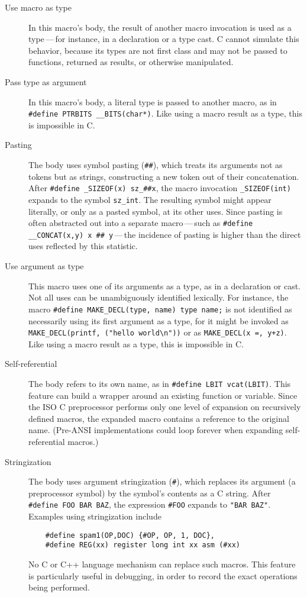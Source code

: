 \documentclass[10pt]{article}
\begin{document}
\begin{description}
\item[Use macro as type]
  In this macro's body, the result of another macro invocation is used as a
  type\,---\,for instance, in a declaration or a type cast.  C cannot
  simulate this behavior, because its types are not first class and may not
  be passed to functions, returned as results, or otherwise manipulated.

\item[Pass type as argument]
  In this macro's body, a literal type is passed to another macro, as in
  {\tt \#define PTRBITS \verb|__BITS|(char*)}.  Like using a macro result
  as a type, this is impossible in C\@.

\item[Pasting]\label{def:pasting}
  The body uses symbol pasting ({\tt \#\#}), which treats its arguments not
  as tokens but as strings, constructing a new token out of their
  concatenation.  After {\tt \#define \verb|_SIZEOF|(x) \verb|sz_|\#\#x},
  the macro invocation {\tt \verb|_SIZEOF|(int)} expands to the 
  symbol {\tt \verb|sz_int|}.  The resulting symbol might appear literally, or
  only as a pasted symbol, at its other uses.  Since pasting is often
  abstracted out into a separate macro\,---\,such as {\tt \#define
  \verb|__CONCAT|(x,y) x \#\# y}\,---\,the incidence of pasting is higher
  than the direct uses reflected by this statistic.

\item[Use argument as type]
  This macro uses one of its arguments as a type, as in a declaration or
  cast.  Not all uses can be unambiguously identified lexically.  For
  instance, the macro {\tt \#define \verb|MAKE_DECL|(type, name) type
  name;} is not identified as necessarily using its first argument as a
type, for it might be invoked as {\tt \verb|MAKE_DECL|(printf, ("hello
world\verb|\|n"))} or as {\tt \verb|MAKE_DECL|(x =, y+z)}.  Like using a
macro result as a type, this is impossible in C\@.

\item[Self-referential]
  The body refers to its own name, as in {\tt \#define LBIT vcat(LBIT)}.
  This feature can build a wrapper around an existing function or variable.
  Since the ISO C preprocessor performs only one level of expansion on
  recursively defined macros, the expanded macro contains a reference to
  the original name.  (Pre-ANSI implementations could loop forever when
  expanding self-referential macros.)

\item[Stringization]
  The body uses argument stringization ({\tt \#}), which replaces its
  argument (a preprocessor symbol) by the symbol's contents as a C string.
  After {\tt \#define FOO BAR BAZ}, the expression {\tt \#FOO} expands to
  {\tt "BAR~BAZ"}.  Examples using stringization include
\begin{verbatim}
    #define spam1(OP,DOC) {#OP, OP, 1, DOC},
    #define REG(xx) register long int xx asm (#xx)
\end{verbatim}
  No C or C++ language mechanism can replace such macros.  This feature is
  particularly useful in debugging, in order to record the exact
  operations being performed.


\end{description}
\end{document}
